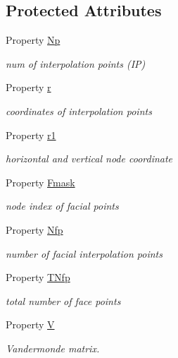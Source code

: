 \subsection*{Protected Attributes}
\begin{DoxyCompactItemize}
\item 
Property \hyperlink{class_std_prism_quad_a5cd535e7636a38caea27f20cb67691ba}{Np}
\begin{DoxyCompactList}\small\item\em num of interpolation points (IP) \end{DoxyCompactList}\item 
Property \hyperlink{class_std_prism_quad_ab1bbbef07ec9f1a9f0727140c5c26f39}{r}
\begin{DoxyCompactList}\small\item\em coordinates of interpolation points \end{DoxyCompactList}\item 
Property \hyperlink{class_std_prism_quad_a230c187b1fb06695e0e2c78d0bfe9984}{r1}
\begin{DoxyCompactList}\small\item\em horizontal and vertical node coordinate \end{DoxyCompactList}\item 
Property \hyperlink{class_std_prism_quad_a649984ecd5ff138a9cb8a0aa6f14be96}{Fmask}
\begin{DoxyCompactList}\small\item\em node index of facial points \end{DoxyCompactList}\item 
Property \hyperlink{class_std_prism_quad_a0393c604ce4f8cbe80b3da8d0711577a}{Nfp}
\begin{DoxyCompactList}\small\item\em number of facial interpolation points \end{DoxyCompactList}\item 
Property \hyperlink{class_std_prism_quad_a0faa2f0b14a5cc2b30f1d9fc48228b5c}{T\+Nfp}
\begin{DoxyCompactList}\small\item\em total number of face points \end{DoxyCompactList}\item 
Property \hyperlink{class_std_prism_quad_adbe346a24b9a20a37713d9c856e2db39}{V}
\begin{DoxyCompactList}\small\item\em Vandermonde matrix. \end{DoxyCompactList}\item 

\end{DoxyCompactItemize}
